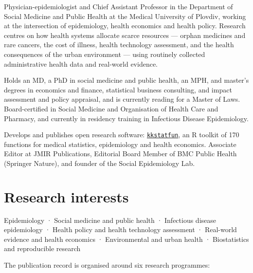 \documentclass[
  10.5pt,
  a4paper,
  DIV=11,
  numbers=noendperiod]{scrartcl}
\let\oldtexttt\texttt
\renewcommand{\texttt}[1]{{\color{cvbronze}\small\oldtexttt{#1}}}
\begin{document}
Physician-epidemiologist and Chief Assistant Professor in the Department
of Social Medicine and Public Health at the Medical University of
Plovdiv, working at the intersection of epidemiology, health economics
and health policy. Research centres on how health systems allocate
scarce resources --- orphan medicines and rare cancers, the cost of
illness, health technology assessment, and the health consequences of
the urban environment --- using routinely collected administrative
health data and real-world evidence.

Holds an MD, a PhD in social medicine and public health, an MPH, and
master's degrees in economics and finance, statistical business
consulting, and impact assessment and policy appraisal, and is currently
reading for a Master of Laws. Board-certified in Social Medicine and
Organisation of Health Care and Pharmacy, and currently in residency
training in Infectious Disease Epidemiology.

Develops and publishes open research software:
\href{kkstatfun.qmd}{\texttt{kkstatfun}}, an R toolkit of 170 functions
for medical statistics, epidemiology and health economics. Associate
Editor at JMIR Publications, Editorial Board Member of BMC Public Health
(Springer Nature), and founder of the Social Epidemiology Lab.

\section{Research interests}\label{research-interests}

Epidemiology · Social medicine and public health · Infectious disease
epidemiology · Health policy and health technology assessment ·
Real-world evidence and health economics · Environmental and urban
health · Biostatistics and reproducible research

The publication record is organised around six research programmes:
\end{document}
